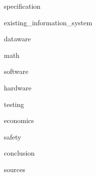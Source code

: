 \documentclass[a4paper,utf8,pointsection,pointsection,nocolumnvii,nocolumnviii,nocolumnsxix]{eskdtext}
\begin{document}






\begin{ESKDtitlePage}\end{ESKDtitlePage}
\tableofcontents
\newpage


{specification}

{existing_information_system}

{dataware}

{math}

{software}

{hardware}

{testing}

{economics}

{safety}

{conclusion}

{sources}
\end{document}
